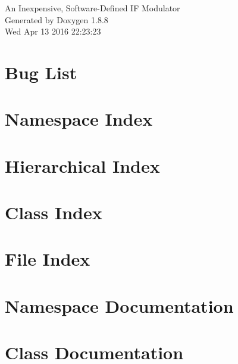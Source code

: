 \documentclass[twoside]{book}
\newcommand{\+}{\discretionary{\mbox{\scriptsize$\hookleftarrow$}}{}{}}
\newcommand{\clearemptydoublepage}{%
  \newpage{\pagestyle{empty}\cleardoublepage}%
}
\begin{document}
\hypersetup{pageanchor=false,
             bookmarks=true,
             bookmarksnumbered=true,
             pdfencoding=unicode
            }
\begin{titlepage}
\vspace*{7cm}
\begin{center}%
{\Large An Inexpensive, Software-\/\+Defined I\+F Modulator }\\
\vspace*{1cm}
{\large Generated by Doxygen 1.8.8}\\
\vspace*{0.5cm}
{\small Wed Apr 13 2016 22:23:23}\\
\end{center}
\end{titlepage}
\clearemptydoublepage
\tableofcontents
\clearemptydoublepage
{}
\hypersetup{pageanchor=true}

\chapter{Bug List}
\label{bug}
\hypertarget{bug}{}

\chapter{Namespace Index}

\chapter{Hierarchical Index}

\chapter{Class Index}

\chapter{File Index}

\chapter{Namespace Documentation}

\chapter{Class Documentation}





\end{document}
